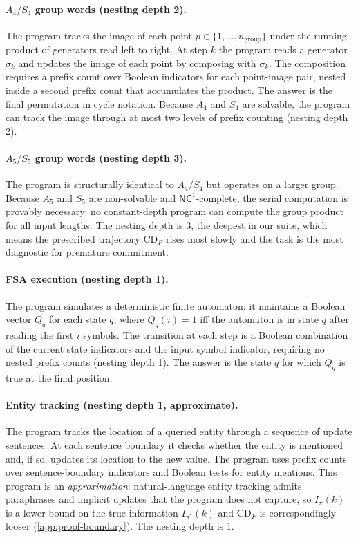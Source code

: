 \documentclass[11pt]{article}
\newcommand{\CDP}{\mathrm{CD}_{P}}
\begin{document}
\paragraph{$A_4/S_4$ group words (nesting depth 2).}
The program tracks the image of each point $p \in \{1,\dots,n_{\mathrm{group}}\}$
under the running product of generators read left to right. At step $k$ the
program reads a generator $\sigma_k$ and updates the image of each point by
composing with $\sigma_k$. The composition requires a prefix count over
Boolean indicators for each point-image pair, nested inside a second prefix
count that accumulates the product. The answer is the final permutation in
cycle notation. Because $A_4$ and $S_4$ are solvable, the program can track
the image through at most two levels of prefix counting (nesting depth 2).

\paragraph{$A_5/S_5$ group words (nesting depth 3).}
The program is structurally identical to $A_4/S_4$ but operates on a larger
group. Because $A_5$ and $S_5$ are non-solvable and $\mathsf{NC}^1$-complete,
the serial computation is provably necessary: no constant-depth program can
compute the group product for all input lengths. The nesting depth is 3, the
deepest in our suite, which means the prescribed trajectory $\CDP$ rises most
slowly and the task is the most diagnostic for premature commitment.

\paragraph{FSA execution (nesting depth 1).}
The program simulates a deterministic finite automaton: it maintains a Boolean
vector $Q_{q}$ for each state $q$, where $Q_{q}(i) = 1$ iff the automaton is
in state $q$ after reading the first $i$ symbols. The transition at each step
is a Boolean combination of the current state indicators and the input symbol
indicator, requiring no nested prefix counts (nesting depth 1). The answer is
the state $q$ for which $Q_{q}$ is true at the final position.

\paragraph{Entity tracking (nesting depth 1, approximate).}
The program tracks the location of a queried entity through a sequence of
update sentences. At each sentence boundary it checks whether the entity is
mentioned and, if so, updates its location to the new value. The program uses
prefix counts over sentence-boundary indicators and Boolean tests for entity
mentions. This program is an \emph{approximation}: natural-language entity
tracking admits paraphrases and implicit updates that the program does not
capture, so $I_{\pi}(k)$ is a lower bound on the true information
$I_{\pi^{*}}(k)$ and $\CDP$ is correspondingly looser
(\cref{app:proof-boundary}). The nesting depth is 1.
\end{document}
